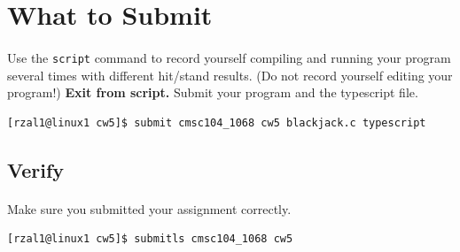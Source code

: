 \documentclass[letter,11pt]{article}
\begin{document}
\section*{What to Submit}
\paragraph{}Use the \texttt{script} command to record yourself compiling and running your program several times with different hit/stand results. (Do not record yourself editing your program!) \textbf{Exit from script.} Submit your program and the typescript file.
\begin{verbatim}
[rzal1@linux1 cw5]$ submit cmsc104_1068 cw5 blackjack.c typescript
\end{verbatim}

\subsection*{Verify}
\paragraph{}Make sure you submitted your assignment correctly.
\begin{verbatim}
[rzal1@linux1 cw5]$ submitls cmsc104_1068 cw5
\end{verbatim}
\end{document}
